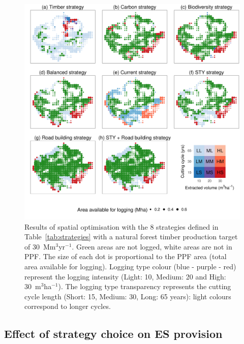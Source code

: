 \documentclass{article}
\begin{document}
\begin{figure}
    \centering
    \includegraphics[width=0.8\linewidth]{graphs/mapsScenarios.pdf}
    \caption{Results of spatial optimisation with the 8 strategies defined in Table~\ref{tab:strategies} with a natural forest timber production target of 30~Mm$^3$yr$^{-1}$. Green areas are not logged, white areas are not in PPF. The size of each dot is proportional to the PPF area (total area available for logging). Logging type colour (blue - purple - red) represent the logging intensity (Light: 10, Medium: 20 and High: 30~m$^3$ha$^{-1}$). The logging type transparency represents the cutting cycle length (Short: 15, Medium: 30, Long: 65 years): light colours correspond to longer cycles.}
    \label{fig:mapsStrateg}
\end{figure}

\subsection{Effect of strategy choice on ES provision}
\end{document}
